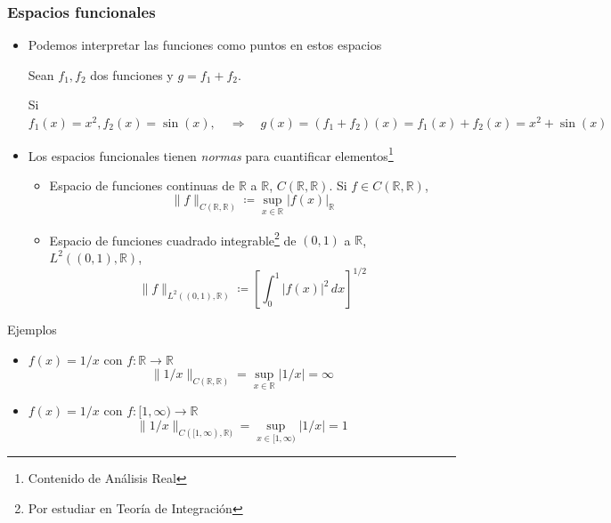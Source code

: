 \documentclass[12pt,aspectratio=169,xcolor=dvipsnames]{beamer}
\newcommand{\R}{\mathbb{R}}
\begin{document}
\begin{frame}[t]\frametitle{Espacios funcionales}
    \begin{footnotesize}
    \begin{itemize}
        \item<+-> Podemos interpretar las funciones como puntos en estos espacios
            \begin{exampleblock}{}
                Sean $f_1, f_2$ dos funciones y $g = f_1 + f_2$. 

                Si $f_1(x) = x^2, f_2(x) = \sin(x), \quad\Rightarrow\quad g(x) = (f_1+f_2)(x) = f_1(x)+f_2(x) = x^2+\sin(x)$
            \end{exampleblock}
        \item<+-> Los espacios funcionales tienen \emph{normas} para cuantificar elementos\footnote{Contenido de Análisis Real}
            \begin{itemize}
                \item<+-> Espacio de funciones continuas de $\R$ a $\R$, $C(\R, \R)$. Si $f\in C(\R, \R)$, 
                    $$ \| f \|_{C(\R, \R)} \coloneqq \sup_{ x\in  \R}|f(x)|_{\R} $$
                \item<+-> Espacio de funciones cuadrado integrable\footnote{Por estudiar en Teoría de Integración} de $(0,1)$ a $\R$, $L^2((0,1), \R)$,
                    $$ \| f \|_{L^2((0,1), \R)} \coloneqq \left[ \int_0^1|f(x)|^2\,dx \right]^{1/2} $$
            \end{itemize}
    \end{itemize}
    \end{footnotesize}
\end{frame}
\begin{frame}{Ejemplos}
    \begin{itemize}
        \item<+-> $f(x) = 1/x$ con $f:\R \to \R$
            $$ \| 1/x \|_{C(\R, \R)} =\sup_{x\in \R} |1/x| = \infty$$
        \item<+-> $f(x) = 1/x$ con $f:[1,\infty) \to \R$
            $$\|1/x\|_{C([1,\infty),\R)} = \sup_{x\in [1,\infty)}|1/x| = 1 $$
    \end{itemize}



\end{frame}
\end{document}

